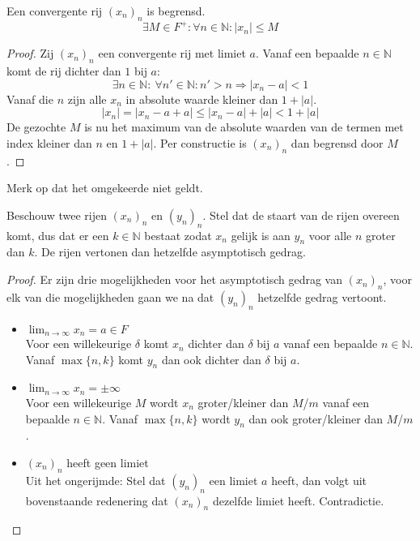 \documentclass[main.tex]{subfiles}
\begin{document}
\begin{pr}
  \label{pr:convergente-rij-begrensd}
  Een convergente rij $(x_{n})_{n}$ is begrensd.
  \[ \exists M \in F^{+}: \forall n\in \mathbb{N}: |x_{n}| \le M \]

  \begin{proof}
    Zij $(x_{n})_{n}$ een convergente rij met limiet $a$.
    Vanaf een bepaalde $n\in \mathbb{N}$ komt de rij dichter dan $1$ bij $a$:
    \[ \exists n\in \mathbb{N}:\ \forall n'\in \mathbb{N}: n'>n\Rightarrow |x_{n}-a|<1 \]
    Vanaf die $n$ zijn alle $x_{n}$ in absolute waarde kleiner dan $1+|a|$.
    \[ |x_{n}| = |x_{n}-a+a| \le |x_{n}-a|+|a| <1+|a| \]
    De gezochte $M$ is nu het maximum van de absolute waarden van de termen met index kleiner dan $n$ en $1+|a|$.
    Per constructie is $(x_{n})_{n}$ dan begrensd door $M$.
  \end{proof}
\end{pr}

\begin{opm}
  Merk op dat het omgekeerde niet geldt.
\end{opm}

\begin{pr}
  Beschouw twee rijen $(x_{n})_{n}$ en $(y_{n})_{n}$.
  Stel dat de staart van de rijen overeen komt, dus dat er een $k\in \mathbb{N}$ bestaat zodat $x_{n}$ gelijk is aan $y_{n}$ voor alle $n$ groter dan $k$.
  De rijen vertonen dan hetzelfde asymptotisch gedrag.
  \begin{proof}
    Er zijn drie mogelijkheden voor het asymptotisch gedrag van $(x_{n})_{n}$, voor elk van die mogelijkheden gaan we na dat $(y_{n})_{n}$ hetzelfde gedrag vertoont.
    \begin{itemize}
    \item $\lim_{n \rightarrow \infty}x_{n} = a\in F$\\
      Voor een willekeurige $\delta$ komt $x_{n}$ dichter dan $\delta$ bij $a$ vanaf een bepaalde $n\in \mathbb{N}$.
      Vanaf $\max\{n,k\}$ komt $y_{n}$ dan ook dichter dan $\delta$ bij $a$.
    \item $\lim_{n \rightarrow \infty}x_{n} = \pm \infty$\\
      Voor een willekeurige $M$ wordt $x_{n}$ groter/kleiner dan $M$/$m$ vanaf een bepaalde $n\in \mathbb{N}$.
      Vanaf $\max\{n,k\}$ wordt $y_{n}$ dan ook groter/kleiner dan $M$/$m$.
    \item $(x_{n})_{n}$ heeft geen limiet\\
      Uit het ongerijmde:
      Stel dat $(y_{n})_{n}$ een limiet $a$ heeft, dan volgt uit bovenstaande redenering dat $(x_{n})_{n}$ dezelfde limiet heeft.
      Contradictie.
    \end{itemize}
  \end{proof}
  \feed
\end{pr}
\end{document}
